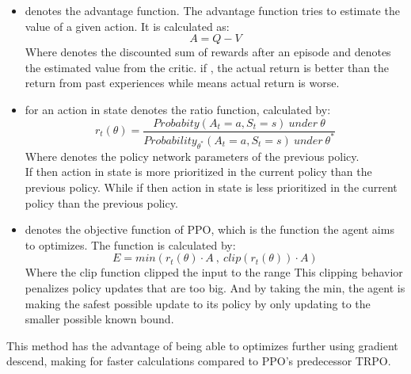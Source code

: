 \documentclass[a4paper]{article}
\begin{document}
    \begin{itemize}
        \item {} denotes the advantage function. The advantage function tries to estimate the value of a given action. It is calculated as:
            \[A = Q - V\]
            Where  denotes the discounted sum of rewards after an episode and  denotes the estimated value from the critic. if , the actual return is better than the return from past experiences while  means actual return is worse.
        \item {} for an action  in state  denotes the ratio function, calculated by:
            \[r_t(\theta) = \frac{Probabity(A_t = a, S_t = s)\ under\ \theta}{Probability_{\theta^*}(A_t = a, S_t = s)\ under\ {\theta}^*}\]
            Where \boldmath{$\theta^*$} denotes the policy network parameters of the previous policy.
            \\
            If  then action  in state  is more prioritized in the current policy than the previous policy. 
            While if  then action  in state  is less prioritized in the current policy than the previous policy. 
        \item {} denotes the objective function of PPO, which is the function the agent aims to optimizes. The function is calculated by:
            \[E = min( r_t(\theta) \cdot A\ ,\ clip(r_t(\theta)) \cdot A )\]
            Where the clip function clipped the input to the range 
            This clipping behavior penalizes policy updates that are too big. And by taking the min, the agent is making the safest possible update to its policy by only updating to the smaller possible known bound.
    \end{itemize}   
    This method has the advantage of being able to optimizes further using gradient descend, making for faster calculations compared to PPO's predecessor TRPO.
\end{document}
